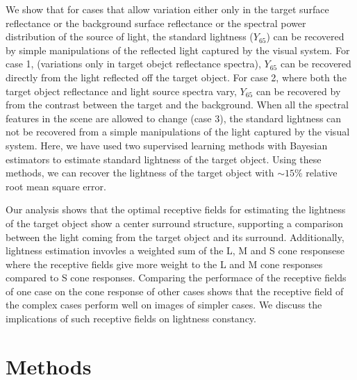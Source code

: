 \documentclass{jov}
\begin{document}
We show that for cases that allow variation either only in the target surface reflectance or the background surface reflectance or the spectral power distribution of the source of light, the standard lightness ($Y_{65}$) can be recovered by simple manipulations of the reflected light captured by the visual system. For case 1, (variations only in target obejct reflectance spectra), $Y_{65}$ can be recovered directly from the light reflected off the target object. For case 2, where both the target object reflectance and light source spectra vary, $Y_{65}$ can be recovered by from the contrast between the target and the background. When all the spectral features in the scene are allowed to change (case 3), the standard lightness can not be recovered from a simple manipulations of the light captured by the visual system. Here, we have used two supervised learning methods with Bayesian estimators to estimate standard lightness of the target object. Using these methods, we can recover the lightness of the target object with $\sim 15\%$ relative root mean square error. 

Our analysis shows that the optimal receptive fields for estimating the lightness of the target object show a center surround structure, supporting a comparison between the light coming from the target object and its surround. Additionally, lightness estimation invovles a weighted sum of the L, M and S cone responsese where the receptive fields give more weight to the L and M cone responses compared to S cone responses. Comparing the performace of the receptive fields of one case on the cone response of other cases shows that the receptive field of the complex cases perform well on images of simpler cases.  We discuss the implications of such receptive fields on lightness constancy. 

\section{Methods}
\end{document}

